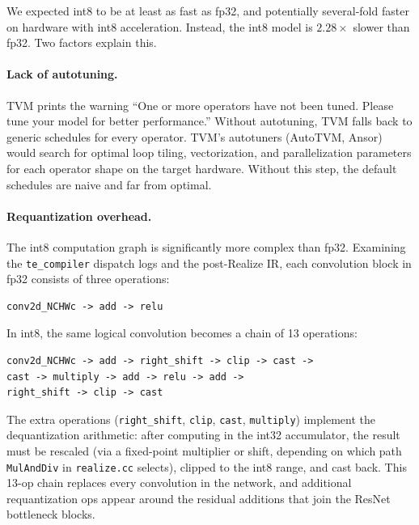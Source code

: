 \documentclass[11pt,a4paper]{article}
\begin{document}
We expected int8 to be at least as fast as fp32, and potentially several-fold faster on hardware with int8 acceleration. Instead, the int8 model is $2.28\times$ slower than fp32. Two factors explain this.

\paragraph{Lack of autotuning.} TVM prints the warning ``One or more operators have not been tuned. Please tune your model for better performance.'' Without autotuning, TVM falls back to generic schedules for every operator. TVM's autotuners (AutoTVM, Ansor) would search for optimal loop tiling, vectorization, and parallelization parameters for each operator shape on the target hardware. Without this step, the default schedules are naive and far from optimal.

\paragraph{Requantization overhead.} The int8 computation graph is significantly more complex than fp32. Examining the \texttt{te\_compiler} dispatch logs and the post-Realize IR, each convolution block in fp32 consists of three operations:

\begin{lstlisting}
conv2d_NCHWc -> add -> relu
\end{lstlisting}

In int8, the same logical convolution becomes a chain of 13 operations:

\begin{lstlisting}
conv2d_NCHWc -> add -> right_shift -> clip -> cast ->
cast -> multiply -> add -> relu -> add ->
right_shift -> clip -> cast
\end{lstlisting}

The extra operations (\texttt{right\_shift}, \texttt{clip}, \texttt{cast}, \texttt{multiply}) implement the dequantization arithmetic: after computing in the int32 accumulator, the result must be rescaled (via a fixed-point multiplier or shift, depending on which path \texttt{MulAndDiv} in \texttt{realize.cc} selects), clipped to the int8 range, and cast back. This 13-op chain replaces every convolution in the network, and additional requantization ops appear around the residual additions that join the ResNet bottleneck blocks.
\end{document}
